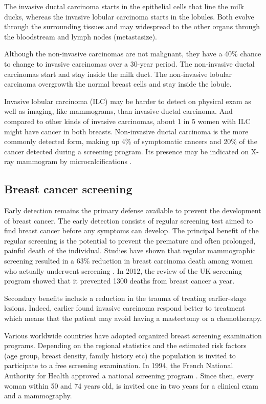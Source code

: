 The invasive ductal carcinoma starts in the epithelial cells that line the milk ducks, whereas the invasive lobular carcinoma starts in the lobules. Both evolve through the surrounding tissues and may widespread to the other organs through the bloodstream and lymph nodes (metastasize). 

Although the non-invasive carcinomas are not malignant, they have a 40\% chance to change to invasive carcinomas over a 30-year period. The non-invasive ductal carcinomas start and stay inside the milk duct. The non-invasive lobular carcinoma overgrowth the normal breast cells and stay inside the lobule. 

Invasive lobular carcinoma (ILC)  may be harder to detect on physical exam as well as imaging, like mammograms, than invasive ductal carcinoma. And compared to other kinds of invasive carcinomas, about 1 in 5 women with ILC might have cancer in both breasts.  Non-invasive ductal carcinoma is the more commonly detected form, making up 4\% of symptomatic cancers and 20\% of the cancer detected during a screening program. Its presence may be indicated on X-ray mammogram by microcalcifications \citep{acs_cancer_2017}.
 
\subsection{Breast cancer screening}\label{subsection:cancerscrenning}
Early detection remains the primary defense available to prevent the development of breast cancer. The early detection consists of regular screening test aimed to find breast cancer before any symptoms can develop.  The principal benefit of the regular screening is the potential to prevent the premature and often prolonged, painful death of the individual. Studies have shown that regular mammographic screening resulted in a $63\%$ reduction in breast carcinoma death among women who actually underwent screening \citep{tabar_beyond_2001}. In 2012, the review of the UK screening program \citep{NHSBSP_2012} showed that it prevented 1300 deaths from breast cancer a year. 

Secondary benefits include a reduction in the trauma of treating earlier-stage lesions. Indeed, earlier found invasive carcinoma respond better to treatment which means that the patient may avoid having a mastectomy or a chemotherapy.

Various worldwide countries have adopted organized breast screening examination programs. Depending on the regional statistics and the estimated risk factors (age group, breast density, family history etc) the population is invited to participate to a free screening examination. In 1994, the French National Authority for Health approved a national screening program \citep{HAS_2016}. Since then, every woman within 50 and 74 years old, is invited one in two years for a clinical exam and a mammography.

